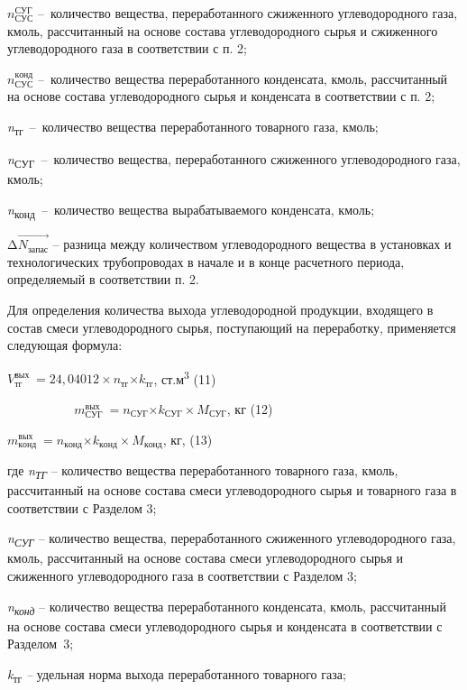 \(n_{СУС}^{СУГ}\) --~количество вещества, переработанного сжиженного
углеводородного газа, кмоль, рассчитанный на основе состава
углеводородного сырья и сжиженного углеводородного газа в соответствии с
п. 2;

\(n_{СУС}^{конд}\) --~количество вещества переработанного конденсата,
кмоль, рассчитанный на основе состава углеводородного сырья и конденсата
в соответствии с п. 2;

\emph{n}\textsubscript{тг}~--~количество вещества переработанного
товарного газа, кмоль;

\emph{n}\textsubscript{СУГ}~--~количество вещества, переработанного
сжиженного углеводородного газа, кмоль;

\emph{n}\textsubscript{конд}~--~количество вещества вырабатываемого
конденсата, кмоль;

\(\mathrm{\Delta}\overrightarrow{Ν_{запас}}\) -- разница между
количеством углеводородного вещества в установках и технологических
трубопроводах в начале и в конце расчетного периода, определяемый в
соответствии п. 2.

Для определения количества выхода углеводородной продукции, входящего в
состав смеси углеводородного сырья, поступающий на переработку,
применяется следующая формула:

\(V_{тг}^{вых}\  = 24,04012 \times n_{тг}{\times k}_{тг}\),
ст.м\textsuperscript{3} (11)

\(\ \ \ \ \ \ \ \ \ \ \ \ \ \ \ \ \ \ \ \ \ \ \ \ m_{СУГ}^{вых}\  = n_{СУГ}{\times k}_{СУГ} \times M_{СУГ}\),
кг (12)

\(m_{конд}^{вых}\  = n_{конд}{\times k}_{конд} \times M_{конд}\), кг,
(13)

где \emph{n\textsubscript{ТГ}} -- количество вещества переработанного
товарного газа, кмоль, рассчитанный на основе состава смеси
углеводородного сырья и товарного газа в соответствии с Разделом 3;

\emph{n\textsubscript{СУГ}} -- количество вещества, переработанного
сжиженного углеводородного газа, кмоль, рассчитанный на основе состава
смеси углеводородного сырья и сжиженного углеводородного газа в
соответствии с Разделом 3;

\emph{n\textsubscript{конд}} -- количество вещества переработанного
конденсата, кмоль, рассчитанный на основе состава смеси углеводородного
сырья и конденсата в соответствии с Разделом~3;

\emph{k}\textsubscript{тг} \emph{--} удельная норма выхода
переработанного товарного газа;


